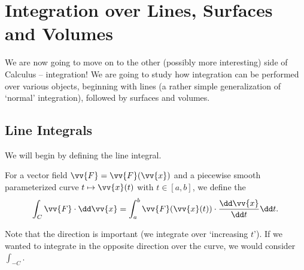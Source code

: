 \section{Integration over Lines, Surfaces and Volumes}

We are now going to move on to the other (possibly more interesting) side of Calculus -- integration! We are going to study how integration can be performed over various objects, beginning with lines (a rather simple generalization of `normal' integration), followed by surfaces and volumes.

\subsection{Line Integrals}

We will begin by defining the line integral.

\begin{definition}
	For a vector field $\vv{F} = \vv{F}(\vv{x})$ and a piecewise smooth parameterized curve $t \mapsto \vv{x}(t)$ with $t \in [a, b]$, we define the 
	$$
	\int_C \vv{F} \cdot \dd \vv{x} = \int_a^b \vv{F}(\vv{x}(t)) \cdot \frac{\dd \vv{x}}{\dd t} \dd t.
 	$$
\end{definition}

Note that the direction is important (we integrate over `increasing $t$'). If we wanted to integrate in the opposite direction over the curve, we would consider $\int_{-C}$.

